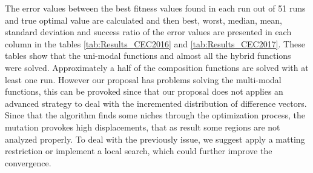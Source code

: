 
The error values between the best fitness values found in each run out of 51 runs and true optimal value are calculated and then best, worst, median, mean, standard deviation and success ratio of the error values are presented in each column in the tables \ref{tab:Results_CEC2016} and \ref{tab:Results_CEC2017}.
%
These tables show that the uni-modal functions and almost all the hybrid functions were solved.
%
Approximately a half of the composition functions are solved with at least one run.
%
However our proposal has problems solving the multi-modal functions, this can be provoked since that our proposal does not applies an advanced strategy to deal with the incremented distribution of difference vectors.
%
Since that the algorithm finds some niches through the optimization process, the mutation provokes high displacements, that as result some regions are not analyzed properly.
%
To deal with the previously issue, we suggest apply a matting restriction or implement a local search, which could further improve the convergence.

